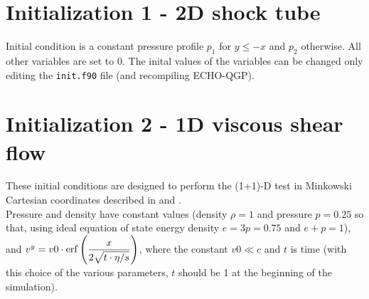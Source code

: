 \section{Initialization 1 - 2D shock tube}
Initial condition is a constant pressure profile $p_1$ for $y\le -x$ and $p_2$ otherwise. All other variables are set to 0. The inital values of the variables can be changed only editing the {\tt init.f90} file (and recompiling ECHO-QGP).

\section{Initialization 2 - 1D viscous shear flow}\label{test1D}
These initial conditions are designed to perform the (1+1)-D test in Minkowski Cartesian coordinates described in \cite{DelZanna:2013eua} and \cite{Takamoto20117002}.\\
Pressure and density have constant values (density $\rho=1$ and pressure $p=0.25$ so that, using ideal equation of state energy density $e=3p=0.75$ and $e+p=1$), and $v^y=v0 \cdot \operatorname{erf}\left ({\dfrac{x}{2\sqrt{t\cdot \eta/s}}}\right )$, where the constant $v0\ll c$ and $t$ is time (with this choice of the various parameters, $t$ should be 1 at the beginning of the simulation).

